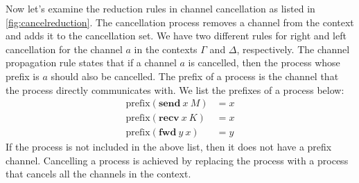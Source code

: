 \documentclass[12pt, openany]{memoir}
\newcommand*{\send}[2]{\textbf{send}\ #1\ #2}
\newcommand*{\recv}[2]{\textbf{recv}\ #1\ #2}
\newcommand*{\fwd}[2]{\textbf{fwd}\ #1\ #2}
\begin{document}
Now let's examine the reduction rules in channel cancellation as listed in \cref{fig:cancelreduction}.
The cancellation process removes a channel from the context and adds it to the cancellation set.
We have two different rules for right and left cancellation for the channel $a$ in the contexts $\Gamma$ and $\Delta$, respectively.
The channel propagation rule states that if a channel $a$ is cancelled, then the process whose prefix is $a$ should also be cancelled.
The prefix of a process is the channel that the process directly communicates with. We list the prefixes of a process below:
\begin{align*}
  \text{prefix}(\send{x}{M}) &= x \\
  \text{prefix}(\recv{x}{K}) &= x \\
  \text{prefix}(\fwd{y}{x}) &= y
\end{align*}
If the process is not included in the above list, then it does not have a prefix channel.
Cancelling a process is achieved by replacing the process with a process that cancels all the channels in the context. 
\end{document}
